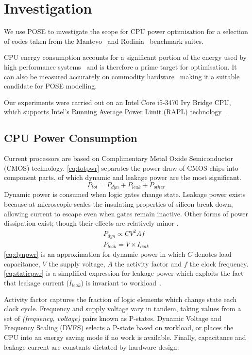 \section{Investigation}
\label{sec:investigation}
\noindent
We use POSE to investigate the scope for CPU power optimisation for a selection of codes taken from the Mantevo~\cite{heroux:2009aa} and Rodinia~\cite{che:2009aa} benchmark suites.

CPU energy consumption accounts for a significant portion of the energy used by high performance systems~\cite{rong:2010aa} and is therefore a prime target for optimisation.
It can also be measured accurately on commodity hardware~\cite{hackenberg:2013aa} making it a suitable candidate for POSE modelling.

Our experiments were carried out on an Intel Core i5-3470 Ivy Bridge CPU, which supports Intel's Running Average Power Limit (RAPL) technology~\cite{david:2010aa}.

\subsection{CPU Power Consumption}
\label{ssec:cpupower}
\noindent
Current processors are based on Complimentary Metal Oxide Semiconductor (CMOS) technology.
\autoref{eq:totpwr} separates the power draw of CMOS chips into component parts, of which dynamic and leakage power are the most significant.
\begin{equation}
\label{eq:totpwr}
P_{tot} = P_{dyn} + P_{leak} + P_{other}
\end{equation}
Dynamic power is consumed when logic gates change state.
Leakage power exists because at microscopic scales the insulating properties of silicon break down, allowing current to escape even when gates remain inactive.
Other forms of power dissipation exist; though their effects are relatively minor \cite{kaxiras:2008aa}.
\begin{gather}
P_{dyn} \propto CV^{2}Af \label{eq:dynpwr} \\
P_{leak} = V\times I_{leak} \label{eq:staticpwr}
\end{gather}
\autoref{eq:dynpwr} is an approximation for dynamic power in which $C$ denotes load capacitance, $V$ the supply voltage, $A$ the activity factor and $f$ the clock frequency.
\autoref{eq:staticpwr} is a simplified expression for leakage power which exploits the fact that leakage current ($I_{leak}$) is invariant to workload~\cite{kim:2003aa}.

Activity factor captures the fraction of logic elements which change state each clock cycle.
Frequency and supply voltage vary in tandem, taking values from a set of \textit{(frequency, voltage)} pairs known as P-states.
Dynamic Voltage and Frequency Scaling (DVFS) selects a P-state based on workload, or places the CPU into an energy saving mode if no work is available.
Finally, capacitance and leakage current are constants dictated by hardware design.

